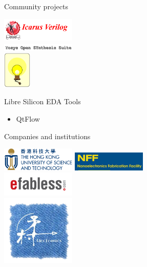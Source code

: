 \documentclass[9pt]{beamer}
\begin{document}
\section[Who]{}
\begin{frame}{Community projects}
	\begin{center}
		\includegraphics[width=100pt]{Icarus.png} \\
		\includegraphics[width=100pt]{Yosys.png} \\
		\includegraphics[height=50pt]{Opencircuit.png}
	\end{center}
\end{frame}

\begin{frame}{Libre Silicon EDA Tools}
	\begin{itemize}
        \item QtFlow
	\end{itemize}    
\end{frame}

\begin{frame}{Companies and institutions}
	\begin{center}
		\includegraphics[width=100pt]{HKUST_Logo.png}
		\includegraphics[width=100pt]{NFF.jpg}  \\
		\includegraphics[width=100pt]{efabless_logo.png} \\
		\includegraphics[width=100pt]{Lanceville.png}
	\end{center}
\end{frame}
\end{document}
